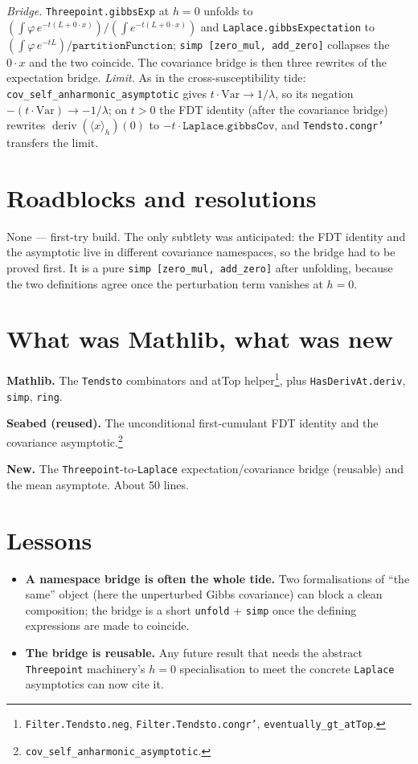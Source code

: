 \documentclass[11pt]{article}
\newcommand{\deriv}{\operatorname{deriv}}
\begin{document}
\emph{Bridge.} \texttt{Threepoint.gibbsExp} at $h=0$ unfolds to
$(\int\varphi\,e^{-t(L+0\cdot x)})/(\int e^{-t(L+0\cdot x)})$ and
\texttt{Laplace.gibbsExpectation} to $(\int\varphi\,e^{-tL})/\texttt{partitionFunction}$;
\texttt{simp [zero\_mul, add\_zero]} collapses the $0\cdot x$ and the two
coincide. The covariance bridge is then three rewrites of the expectation
bridge. \emph{Limit.} As in the cross-susceptibility tide:
\texttt{cov\_self\_anharmonic\_asymptotic} gives $t\cdot\mathrm{Var}\to1/\lambda$,
so its negation $-(t\cdot\mathrm{Var})\to-1/\lambda$; on $t>0$ the FDT identity
(after the covariance bridge) rewrites $\deriv(\langle x\rangle_h)(0)$ to
$-t\cdot\texttt{Laplace.gibbsCov}$, and \texttt{Tendsto.congr'} transfers the
limit.

\section{Roadblocks and resolutions}

None --- first-try build. The only subtlety was anticipated: the FDT identity
and the asymptotic live in different covariance namespaces, so the bridge had
to be proved first. It is a pure \texttt{simp [zero\_mul, add\_zero]} after
unfolding, because the two definitions agree once the perturbation term
vanishes at $h=0$.

\section{What was Mathlib, what was new}

\textbf{Mathlib.} The \texttt{Tendsto} combinators and atTop
helper\footnote{\texttt{Filter.Tendsto.neg}, \texttt{Filter.Tendsto.congr'},
\texttt{eventually\_gt\_atTop}.}, plus \texttt{HasDerivAt.deriv}, \texttt{simp},
\texttt{ring}.

\textbf{Seabed (reused).} The unconditional first-cumulant FDT identity and the
covariance asymptotic.\footnote{\texttt{cov\_self\_anharmonic\_asymptotic}.}

\textbf{New.} The \texttt{Threepoint}-to-\texttt{Laplace} expectation/covariance
bridge (reusable) and the mean asymptote. About 50 lines.

\section{Lessons}

\begin{itemize}[itemsep=3pt]
\item \textbf{A namespace bridge is often the whole tide.} Two formalisations of
  ``the same'' object (here the unperturbed Gibbs covariance) can block a clean
  composition; the bridge is a short \texttt{unfold} + \texttt{simp} once the
  defining expressions are made to coincide.
\item \textbf{The bridge is reusable.} Any future result that needs the abstract
  \texttt{Threepoint} machinery's $h=0$ specialisation to meet the concrete
  \texttt{Laplace} asymptotics can now cite it.
\end{itemize}
\end{document}
